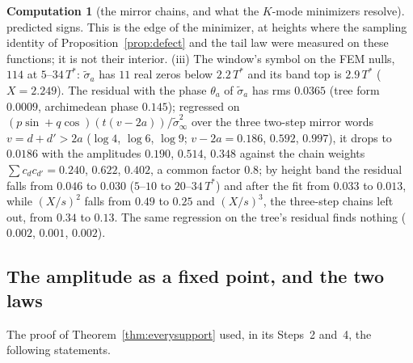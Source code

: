 \documentclass[11pt]{article}
\theoremstyle{definition}
\newtheorem{computation}[theorem]{Computation}
\theoremstyle{remark}
\newcommand{\Tst}{T^{*}}
\begin{document}
\begin{computation}[the mirror chains, and what the $K$-mode minimizers resolve]
predicted signs. This is the edge of the minimizer, at heights where the sampling identity of Proposition~\ref{prop:defect} and the tail law were measured on these functions; it is not their interior. (iii) The window's symbol on the FEM nulls, $114$ at $5$--$34\,\Tst$: $\tilde\sigma_a$ has $11$ real zeros below $2.2\,\Tst$ and its band top is $2.9\,\Tst$ ($X=2.249$). The residual with the phase $\theta_a$ of $\tilde\sigma_a$ has rms $0.0365$ (tree form $0.0009$, archimedean phase $0.145$); regressed on $(p\sin+q\cos)(t(v-2a))/\tilde\sigma_\infty^2$ over the three two-step mirror words $v=d+d'>2a$ ($\log4$, $\log6$, $\log9$; $v-2a=0.186$, $0.592$, $0.997$), it drops to $0.0186$ with the amplitudes $0.190$, $0.514$, $0.348$ against the chain weights $\sum c_dc_{d'}=0.240$, $0.622$, $0.402$, a common factor $0.8$; by height band the residual falls from $0.046$ to $0.030$ ($5$--$10$ to $20$--$34\,\Tst$) and after the fit from $0.033$ to $0.013$, while $(X/s)^2$ falls from $0.49$ to $0.25$ and $(X/s)^3$, the three-step chains left out, from $0.34$ to $0.13$. The same regression on the tree's residual finds nothing ($0.002$, $0.001$, $0.002$).
\end{computation}


\subsection{The amplitude as a fixed point, and the two laws}\label{sec:fixedpoint}

The proof of Theorem~\ref{thm:everysupport} used, in its Steps~2 and~4, the following statements.
\end{document}
